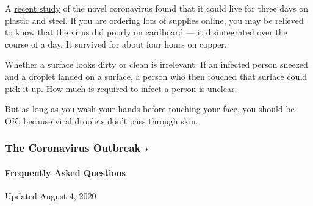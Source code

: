 A
\href{https://www.nytimes.com/2020/03/17/health/coronavirus-surfaces-aerosols.html}{recent
study} of the novel coronavirus found that it could live for three days
on plastic and steel. If you are ordering lots of supplies online, you
may be relieved to know that the virus did poorly on cardboard --- it
disintegrated over the course of a day. It survived for about four hours
on copper.

Whether a surface looks dirty or clean is irrelevant. If an infected
person sneezed and a droplet landed on a surface, a person who then
touched that surface could pick it up. How much is required to infect a
person is unclear.

But as long as you
\href{https://www.nytimes.com/2016/04/21/health/washing-hands.html}{wash
your hands} before
\href{https://www.nytimes.com/2020/03/02/well/live/coronavirus-spread-transmission-face-touching-hands.html}{touching
your face,} you should be OK, because viral droplets don't pass through
skin.

\href{https://www.nytimes.com/news-event/coronavirus?action=click\&pgtype=Article\&state=default\&region=MAIN_CONTENT_3\&context=storylines_faq}{}

\hypertarget{the-coronavirus-outbreak-}{%
\subsubsection{The Coronavirus Outbreak
›}\label{the-coronavirus-outbreak-}}

\hypertarget{frequently-asked-questions}{%
\paragraph{Frequently Asked
Questions}\label{frequently-asked-questions}}

Updated August 4, 2020

